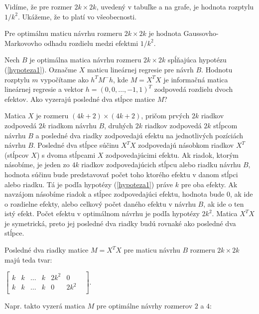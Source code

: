 Vidíme, že pre rozmer $2k \times 2k$, uvedený v tabuľke a na grafe, je hodnota rozptylu $1/k^2$. Ukážeme, že to platí vo všeobecnosti.

\begin{prop}
Pre optimálnu maticu návrhu rozmeru $2k \times 2k$ je hodnota Gaussovho-Markovovho odhadu rozdielu medzi efektmi $1/k^2$.
\end{prop}

\begin{dokaz}
Nech $B$ je optimálna matica návrhu rozmeru $2k \times 2k$ spĺňajúca hypotézu (\ref{hypoteza1}). Označme $X$ maticu lineárnej regresie pre návrh $B$. Hodnotu rozptylu $m$ vypočítame ako $h^T M^- h$,
kde $M = X^T X$ je informačná matica lineárnej regresie a vektor $h = (0, 0, \ldots, -1, 1)^T $ zodpovedá rozdielu dvoch efektov. Ako vyzerajú posledné dva stĺpce matice $M$?

Matica $X$ je rozmeru $(4k + 2) \times (4k + 2)$, pričom prvých $2k$ riadkov zodpovedá $2k$ riadkom návrhu $B$, druhých $2k$ riadkov zodpovedá $2k$ stĺpcom návrhu $B$
a posledné dva riadky zodpovedajú efektu na jednotlivých pozíciách návrhu $B$. Posledné dva stĺpce súčinu $X^T X$ zodpovedajú násobkom riadkov $X^T$ (stĺpcov $X$) s dvoma stĺpcami $X$ zodpovedajúcimi efektu.
Ak riadok, ktorým násobíme, je jeden zo $4k$ riadkov zodpovedajúcich stĺpcu alebo riadku návrhu $B$, hodnota súčinu bude predstavovať počet toho ktorého efektu v danom stĺpci alebo riadku.
Tá je podľa hypotézy (\ref{hypoteza1}) práve $k$ pre oba efekty. Ak navzájom násobíme riadok a stĺpec zodpovedajúci efektu, hodnota bude $0$, ak ide o rozdielne efekty,
alebo celkový počet daného efektu v návrhu $B$, ak ide o ten istý efekt. Počet efektu v optimálnom návrhu je podľa hypotézy $2k^2$.
Matica $X^T X$ je symetrická, preto jej posledné dva riadky budú rovnaké ako posledné dva stĺpce.

Posledné dva riadky matice $M = X^T X$ pre maticu návrhu $B$ rozmeru $2k \times 2k$ majú teda tvar:

\begin{center}
$
\begin{bmatrix}
k & k & \ldots & k & 2k^2 & 0 & \\
k & k & \ldots & k & 0 & 2k^2 & \\
\end{bmatrix}
$.
\end{center}

Napr. takto vyzerá matica $M$ pre optimálne návrhy rozmerov $2$ a $4$:


\end{dokaz}

